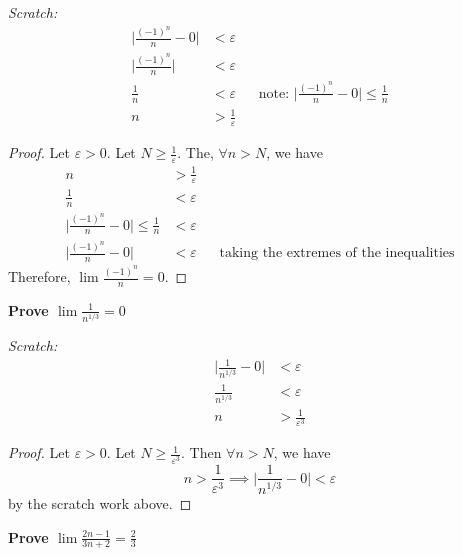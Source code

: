 \documentclass[13pt]{letter}
\begin{document}
\textit{Scratch:}
  \begin{align*}
    \bigg| \frac{(-1)^n}{n} - 0 \bigg| &< \varepsilon \\
    \bigg| \frac{(-1)^n}{n} \bigg| &< \varepsilon \\
    \frac{1}{n} &< \varepsilon && \text{note: } \bigg|
                                    \frac{(-1)^n}{n} - 0 \bigg| \leq
                                  \frac{1}{n} \\
    n &> \frac{1}{\varepsilon}
  \end{align*}
\begin{proof}
  Let $\varepsilon > 0$. Let $N \geq \frac{1}{\varepsilon}$. The,
  $\forall n > N$, we have
  \begin{align*}
    n &> \frac{1}{\varepsilon} \\
    \frac{1}{n} &< \varepsilon \\
    \bigg| \frac{(-1)^n}{n} - 0 \bigg| \leq \frac{1}{n} &< \varepsilon \\
    \bigg| \frac{(-1)^n}{n} - 0 \bigg| &< \varepsilon && \text{taking
                                                         the extremes
                                                         of the inequalities}
  \end{align*}
  Therefore, $\lim \frac{(-1)^n}{n} = 0$.
\end{proof}

\newpage
\textbf{Prove $\lim \frac{1}{n^{1/3}} = 0$}

\textit{Scratch:}
\begin{align*}
  \bigg| \frac{1}{n^{1/3}} - 0 \bigg| &< \varepsilon \\
  \frac{1}{n^{1/3}} &< \varepsilon \\
  n &> \frac{1}{\varepsilon^3}
\end{align*}
\begin{proof}
  Let $\varepsilon > 0$. Let $N \geq \frac{1}{\varepsilon^3}$. Then $\forall n > N$, we have
  \[n > \frac{1}{\varepsilon^3} \implies   \bigg| \frac{1}{n^{1/3}} -
    0 \bigg| < \varepsilon\] by the scratch work above.
\end{proof}

\textbf{Prove $\lim \frac{2n - 1}{3n + 2} = \frac{2}{3}$}
\end{document}
